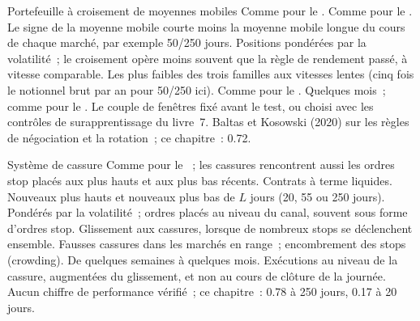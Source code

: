 \begin{strategyfile}{Portefeuille à croisement de moyennes mobiles}\label{strat:s1:trend-following:ma}
 Comme pour le .
 Comme pour le .
 Le signe de la moyenne mobile courte moins la moyenne mobile longue du cours de chaque marché, par exemple 50/250 jours.
 Positions pondérées par la volatilité~; le croisement opère moins souvent que la règle de rendement passé, à vitesse comparable.
 Les plus faibles des trois familles aux vitesses lentes (cinq fois le notionnel brut par an pour 50/250 ici).
 Comme pour le .
 Quelques mois~; comme pour le .
 Le couple de fenêtres fixé avant le test, ou choisi avec les contrôles de surapprentissage du livre~7.
 Baltas et Kosowski (2020) sur les règles de négociation et la rotation~; ce chapitre~: 0.72.
\end{strategyfile}

\begin{strategyfile}{Système de cassure}\label{strat:s1:trend-following:breakout}
 Comme pour le ~; les cassures rencontrent aussi les ordres stop placés aux plus hauts et aux plus bas récents.
 Contrats à terme liquides.
 Nouveaux plus hauts et nouveaux plus bas de $L$ jours (20, 55 ou 250 jours).
 Pondérés par la volatilité~; ordres placés au niveau du canal, souvent sous forme d'ordres stop.
 Glissement aux cassures, lorsque de nombreux stops se déclenchent ensemble.
 Fausses cassures dans les marchés en range~; encombrement des stops (crowding).
 De quelques semaines à quelques mois.
 Exécutions au niveau de la cassure, augmentées du glissement, et non au cours de clôture de la journée.
 Aucun chiffre de performance vérifié~; ce chapitre~: 0.78 à 250 jours, 0.17 à 20 jours.
\end{strategyfile}

